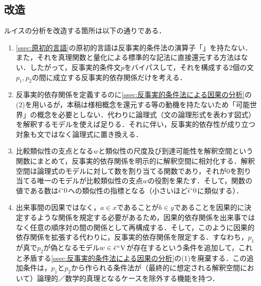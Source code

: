 \subsection{改造}
\label{ssec:改造}

ルイスの分析を改造する箇所は以下の通りである．

\begin{enumerate}
    \item \ref{ssec:原初的言語}の原初的言語は反事実的条件法の演算子「」を持たない．また，それを真理関数と量化による標準的な記法に直接還元する方法はない．したがって，反事実的条件文$p$をバイパスして，それを構成する2個の文$p_1,p_2$の間に成立する反事実的依存関係だけを考える．
    \item 反事実的依存関係を定義するのに\ref{ssec:反事実的条件法による因果の分析}の(2)を用いるが，本稿は様相概念を還元する等の動機を持たないため「可能世界」の概念を必要としない．代わりに論理式（文の論理形式を表わす図式）を解釈するモデルを使えば足りる．それに伴い，反事実的依存性が成り立つ対象も文ではなく論理式に置き換える．
    \item 比較類似性の支点となる$w$と類似性の尺度及び到達可能性を解釈空間という関数にまとめて，反事実的依存関係を明示的に解釈空間に相対化する．解釈空間は論理式のモデルに対して数を割り当てる関数であり，それが$0$を割り当てる唯一のモデルが比較類似性の支点$w$の役割を果たす．そして，関数の値である数は$\breve{\epsilon}{\mspace{1mu}{`}\mspace{1mu}} 0$への類似性の指標となる（小さいほど$\breve{\epsilon}{\mspace{1mu}{`}\mspace{1mu}} 0$に類似する）．
    \item 出来事間の因果ではなく，$a\in x$であることが$b\in y$であることを因果的に決定するような関係を規定する必要があるため，因果的依存関係を出来事ではなく任意の順序対の間の関係として再構成する．そして，このように因果的依存関係を拡張する代わりに，反事実的依存関係を限定する．すなわち，$p_1$が真で$p_2$が偽となるモデル$w\in\breve{\epsilon}{\mspace{1mu}{``}\mspace{1mu}}\mathrm{V}$が存在するという条件を追加して，これと矛盾する\ref{ssec:反事実的条件法による因果の分析}の(1)を廃棄する．この追加条件は，$p_1$と$p_2$から作られる条件法が（最終的に想定される解釈空間において）論理的／数学的真理となるケースを除外する機能を持つ．
\end{enumerate}

